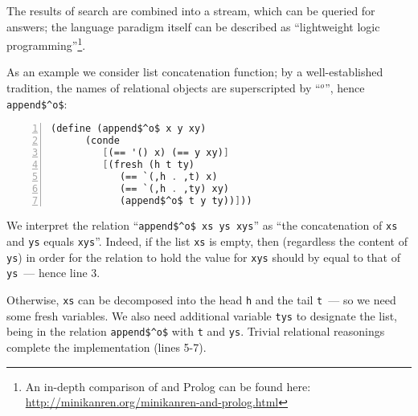 The results of search are combined into a stream, which can be queried for answers; the language paradigm itself
can be described as ``lightweight logic programming''\footnote{An in-depth comparison of \miniKanren and Prolog can be found
here: \url{http://minikanren.org/minikanren-and-prolog.html}}.
 
As an example we consider list concatenation function; by a well-established tradition, the names 
of relational objects are superscripted by ``$^o$'', hence \lstinline{append$^o$}: 

\begin{lstlisting}[mathescape=true,language=scheme,numbers=left,numberstyle=\small,stepnumber=1,numbersep=-5pt]
   (define (append$^o$ x y xy) 
      (conde 
         [(== '() x) (== y xy)]
         [(fresh (h t ty)
            (== `(,h . ,t) x)
            (== `(,h . ,ty) xy)
            (append$^o$ t y ty))]))
\end{lstlisting}

We interpret the relation ``\lstinline{append$^o$ xs ys xys}'' as ``the concatenation of \lstinline{xs} and \lstinline{ys} 
equals \lstinline{xys}''. Indeed, if the list \lstinline{xs} is empty, then (regardless the content of \lstinline{ys}) in order for the relation to hold 
the value for \lstinline{xys} should by equal to that of \lstinline{ys}~--- hence line 3. 

Otherwise, \lstinline{xs} can be decomposed into the head \lstinline{h} and the tail \lstinline{t}~--- so we need some fresh variables. We also
need additional variable \lstinline{tys} to designate the list, being in the relation \lstinline{append$^o$} with \lstinline{t} and \lstinline{ys}.
Trivial relational reasonings complete the implementation (lines 5-7).

